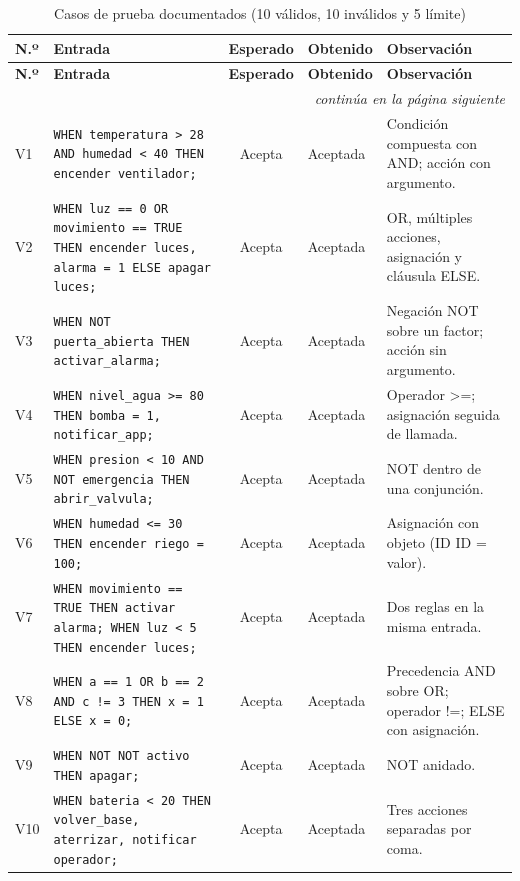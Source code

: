 \documentclass[12pt,a4paper]{article}
\begin{document}
{\footnotesize
\setlength{\tabcolsep}{3pt}
\begin{longtable}{|l|>{\raggedright\arraybackslash}p{4.5cm}|c|>{\raggedright\arraybackslash}p{4.3cm}|>{\raggedright\arraybackslash}p{3.4cm}|}
\caption{Casos de prueba documentados (10 válidos, 10 inválidos y 5 límite)}\label{tab:casos}\\
\hline
\textbf{N.º} & \textbf{Entrada} & \textbf{Esperado} & \textbf{Obtenido} & \textbf{Observación}\\ \hline
\endfirsthead
\hline
\textbf{N.º} & \textbf{Entrada} & \textbf{Esperado} & \textbf{Obtenido} & \textbf{Observación}\\ \hline
\endhead
\hline \multicolumn{5}{r}{\textit{continúa en la página siguiente}}\\
\endfoot
\hline
\endlastfoot
V1 & \texttt{WHEN temperatura \textgreater{} 28 AND humedad \textless{} 40 THEN encender ventilador;} & Acepta & Aceptada & Condición compuesta con AND; acción con argumento.\\ \hline
V2 & \texttt{WHEN luz == 0 OR movimiento == TRUE THEN encender luces, alarma = 1 ELSE apagar luces;} & Acepta & Aceptada & OR, múltiples acciones, asignación y cláusula ELSE.\\ \hline
V3 & \texttt{WHEN NOT puerta\_abierta THEN activar\_alarma;} & Acepta & Aceptada & Negación NOT sobre un factor; acción sin argumento.\\ \hline
V4 & \texttt{WHEN nivel\_agua \textgreater{}= 80 THEN bomba = 1, notificar\_app;} & Acepta & Aceptada & Operador \textgreater{}=; asignación seguida de llamada.\\ \hline
V5 & \texttt{WHEN presion \textless{} 10 AND NOT emergencia THEN abrir\_valvula;} & Acepta & Aceptada & NOT dentro de una conjunción.\\ \hline
V6 & \texttt{WHEN humedad \textless{}= 30 THEN encender riego = 100;} & Acepta & Aceptada & Asignación con objeto (ID ID = valor).\\ \hline
V7 & \texttt{WHEN movimiento == TRUE THEN activar alarma; WHEN luz \textless{} 5 THEN encender luces;} & Acepta & Aceptada & Dos reglas en la misma entrada.\\ \hline
V8 & \texttt{WHEN a == 1 OR b == 2 AND c != 3 THEN x = 1 ELSE x = 0;} & Acepta & Aceptada & Precedencia AND sobre OR; operador !=; ELSE con asignación.\\ \hline
V9 & \texttt{WHEN NOT NOT activo THEN apagar;} & Acepta & Aceptada & NOT anidado.\\ \hline
V10 & \texttt{WHEN bateria \textless{} 20 THEN volver\_base, aterrizar, notificar operador;} & Acepta & Aceptada & Tres acciones separadas por coma.\\ \hline

\end{longtable}}
\end{document}
